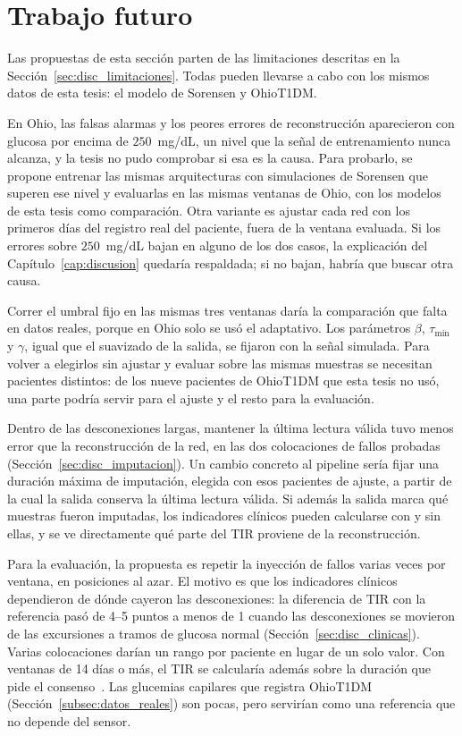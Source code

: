 \documentclass{report}
\begin{document}
\section{Trabajo futuro}
\label{sec:trabajo_futuro}

 Las propuestas de esta sección parten de las limitaciones descritas en la Sección~\ref{sec:disc_limitaciones}. Todas pueden llevarse a cabo con los mismos datos de esta tesis: el modelo de Sorensen y OhioT1DM.
 
En Ohio, las falsas alarmas y los peores errores de reconstrucción aparecieron con glucosa por encima de $250$~mg/dL, un nivel que la señal de entrenamiento nunca alcanza, y la tesis no pudo comprobar si esa es la causa. Para probarlo, se propone entrenar las mismas arquitecturas con simulaciones de Sorensen que superen ese nivel y evaluarlas en las mismas ventanas de Ohio, con los modelos de esta tesis como comparación. Otra variante es ajustar cada red con los primeros días del registro real del paciente, fuera de la ventana evaluada. Si los errores sobre $250$~mg/dL bajan en alguno de los dos casos, la explicación del Capítulo~\ref{cap:discusion} quedaría respaldada; si no bajan, habría que buscar otra causa.
 
Correr el umbral fijo en las mismas tres ventanas daría la comparación que falta en datos reales, porque en Ohio solo se usó el adaptativo. Los parámetros $\beta$, $\tau_{\min}$ y $\gamma$, igual que el suavizado de la salida, se fijaron con la señal simulada. Para volver a elegirlos sin ajustar y evaluar sobre las mismas muestras se necesitan pacientes distintos: de los nueve pacientes de OhioT1DM que esta tesis no usó, una parte podría servir para el ajuste y el resto para la evaluación.
 
Dentro de las desconexiones largas, mantener la última lectura válida tuvo menos error que la reconstrucción de la red, en las dos colocaciones de fallos probadas (Sección~\ref{sec:disc_imputacion}). Un cambio concreto al pipeline sería fijar una duración máxima de imputación, elegida con esos pacientes de ajuste, a partir de la cual la salida conserva la última lectura válida. Si además la salida marca qué muestras fueron imputadas, los indicadores clínicos pueden calcularse con y sin ellas, y se ve directamente qué parte del TIR proviene de la reconstrucción.
 
Para la evaluación, la propuesta es repetir la inyección de fallos varias veces por ventana, en posiciones al azar. El motivo es que los indicadores clínicos dependieron de dónde cayeron las desconexiones: la diferencia de TIR con la referencia pasó de 4--5 puntos a menos de 1 cuando las desconexiones se movieron de las excursiones a tramos de glucosa normal (Sección~\ref{sec:disc_clinicas}). Varias colocaciones darían un rango por paciente en lugar de un solo valor. Con ventanas de 14 días o más, el TIR se calcularía además sobre la duración que pide el consenso~\cite{battelino2019}. Las glucemias capilares que registra OhioT1DM (Sección~\ref{subsec:datos_reales}) son pocas, pero servirían como una referencia que no depende del sensor.
 
\end{document}
